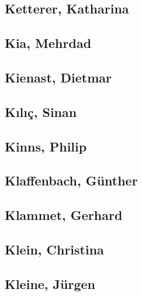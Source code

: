\subsection[Ketterer, Katharina (1)]{Ketterer, Katharina}

\subsection[Kia, Mehrdad (1)]{Kia, Mehrdad}

\subsection[Kienast, Dietmar (2)]{Kienast, Dietmar}


\subsection[Kılıç, Sinan (1)]{Kılıç, Sinan}

\subsection[Kinns, Philip (1)]{Kinns, Philip}

\subsection[Klaffenbach, Günther (1)]{Klaffenbach, Günther}

\subsection[Klammet, Gerhard (1)]{Klammet, Gerhard}

\subsection[Klein, Christina (1)]{Klein, Christina}

\subsection[Kleine, Jürgen (3)]{Kleine, Jürgen}

